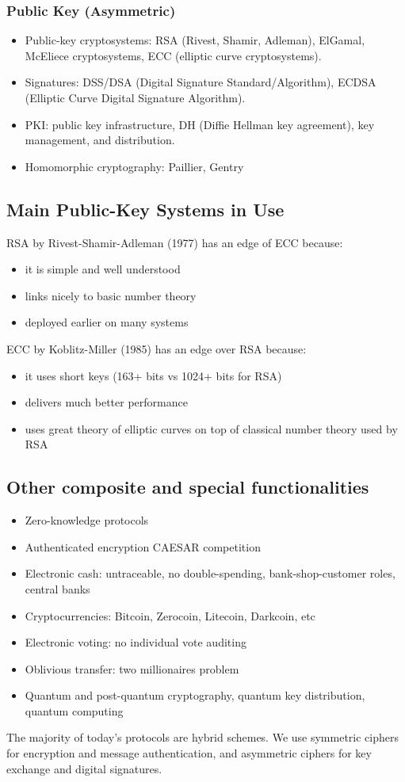 \documentclass{math}
\begin{document}
\subsubsection*{Public Key (Asymmetric)}
\begin{itemize}
  \item Public-key cryptosystems: RSA (Rivest, Shamir, Adleman), ElGamal,
  McEliece cryptosystems, ECC (elliptic curve cryptosystems).
  \item Signatures: DSS/DSA (Digital Signature Standard/Algorithm), ECDSA
  (Elliptic Curve Digital Signature Algorithm).
  \item PKI: public key infrastructure, DH (Diffie Hellman key agreement),
  key management, and distribution.
  \item Homomorphic cryptography: Paillier, Gentry
\end{itemize}

\subsection*{Main Public-Key Systems in Use}
RSA by Rivest-Shamir-Adleman (1977) has an edge of ECC because:
\begin{itemize}
  \item it is simple and well understood
  \item links nicely to basic number theory
  \item deployed earlier on many systems
\end{itemize}
ECC by Koblitz-Miller (1985) has an edge over RSA because:
\begin{itemize}
  \item it uses short keys (163+ bits vs 1024+ bits for RSA)
  \item delivers much better performance
  \item uses great theory of elliptic curves on top of classical number theory
  used by RSA
\end{itemize}

\subsection*{Other composite and special functionalities}
\begin{itemize}
  \item Zero-knowledge protocols
  \item Authenticated encryption CAESAR competition
  \item Electronic cash: untraceable, no double-spending, bank-shop-customer
  roles, central banks
  \item Cryptocurrencies: Bitcoin, Zerocoin, Litecoin, Darkcoin, etc
  \item Electronic voting: no individual vote auditing
  \item Oblivious transfer: two millionaires problem
  \item Quantum and post-quantum cryptography, quantum key distribution,
  quantum computing
\end{itemize}
The majority of today's protocols are hybrid schemes. We use symmetric ciphers
for encryption and message authentication, and asymmetric ciphers for key
exchange and digital signatures.
\end{document}
